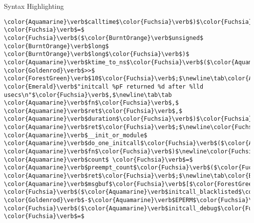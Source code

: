 \begin{frame}{Syntax Highlighting}
\begin{verbatim}
\color{Aquamarine}\verb$calltime$\color{Fuchsia}\verb$)$\color{Fuchsia}\verb$;$\newline\tab\color{Aquamarine}\verb$duration$ \color{Fuchsia}\verb$=$ \color{Fuchsia}\verb$($\color{BurntOrange}\verb$unsigned$ \color{BurntOrange}\verb$long$ \color{BurntOrange}\verb$long$\color{Fuchsia}\verb$)$ \color{Aquamarine}\verb$ktime_to_ns$\color{Fuchsia}\verb$($\color{Aquamarine}\verb$delta$\color{Fuchsia}\verb$)$ \color{Goldenrod}\verb$>>$ \color{ForestGreen}\verb$10$\color{Fuchsia}\verb$;$\newline\tab\color{Aquamarine}\verb$printk$\color{Fuchsia}\verb$($\color{Aquamarine}\verb$KERN_DEBUG$ \color{Emerald}\verb$"initcall %pF returned %d after %lld usecs\n"$\color{Fuchsia}\verb$,$\newline\tab\tab \color{Aquamarine}\verb$fn$\color{Fuchsia}\verb$,$ \color{Aquamarine}\verb$ret$\color{Fuchsia}\verb$,$ \color{Aquamarine}\verb$duration$\color{Fuchsia}\verb$)$\color{Fuchsia}\verb$;$\newline\newline\tab\color{BurntOrange}\verb$return$ \color{Aquamarine}\verb$ret$\color{Fuchsia}\verb$;$\newline\color{Fuchsia}\verb$}$\newline\newline\color{BurntOrange}\verb$int$ \color{Aquamarine}\verb$__init_or_module$ \color{Aquamarine}\verb$do_one_initcall$\color{Fuchsia}\verb$($\color{Aquamarine}\verb$initcall_t$ \color{Aquamarine}\verb$fn$\color{Fuchsia}\verb$)$\newline\color{Fuchsia}\verb${$\newline\tab\color{BurntOrange}\verb$int$ \color{Aquamarine}\verb$count$ \color{Fuchsia}\verb$=$ \color{Aquamarine}\verb$preempt_count$\color{Fuchsia}\verb$($\color{Fuchsia}\verb$)$\color{Fuchsia}\verb$;$\newline\tab\color{BurntOrange}\verb$int$ \color{Aquamarine}\verb$ret$\color{Fuchsia}\verb$;$\newline\tab\color{BurntOrange}\verb$char$ \color{Aquamarine}\verb$msgbuf$\color{Fuchsia}\verb$[$\color{ForestGreen}\verb$64$\color{Fuchsia}\verb$]$\color{Fuchsia}\verb$;$\newline\newline\tab\color{BurntOrange}\verb$if$ \color{Fuchsia}\verb$($\color{Aquamarine}\verb$initcall_blacklisted$\color{Fuchsia}\verb$($\color{Aquamarine}\verb$fn$\color{Fuchsia}\verb$)$\color{Fuchsia}\verb$)$\newline\tab\tab\color{BurntOrange}\verb$return$ \color{Goldenrod}\verb$-$\color{Aquamarine}\verb$EPERM$\color{Fuchsia}\verb$;$\newline\newline\tab\color{BurntOrange}\verb$if$ \color{Fuchsia}\verb$($\color{Aquamarine}\verb$initcall_debug$\color{Fuchsia}\verb$)$\newline\tab\tab\color{Aquamarine}\verb$ret$ \color{Fuchsia}\verb$=$ 
\end{verbatim}
\end{frame}
